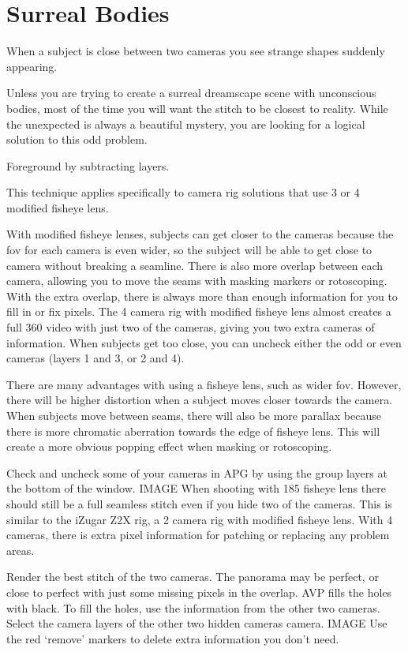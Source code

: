 \chapter{Surreal Bodies}
\pagecolor{white}
\label{chap:39}
\begin{fullwidth}


\problem

{\large When a subject is close between two cameras you see strange shapes suddenly appearing. \par}

Unless you are trying to create a surreal dreamscape scene with unconscious bodies, most of the time you will want the stitch to be closest to reality. While the unexpected is always a beautiful mystery, you are looking for a logical solution to this odd problem.  

\solutions

{\large Foreground by subtracting layers. \par}

This technique applies specifically to camera rig solutions that use 3 or 4 modified fisheye lens.

With modified fisheye lenses, subjects can get closer to the cameras because the fov for each camera is even wider, so the subject will be able to get close to camera without breaking a seamline. There is also more overlap between each camera, allowing you to move the seams with masking markers or rotoscoping. With the extra overlap, there is always more than enough information for you to fill in or fix pixels. The 4 camera rig with modified fisheye lens almost creates a full 360 video with just two of the cameras, giving you two extra cameras of information. When subjects get too close, you can uncheck either the odd or even cameras (layers 1 and 3, or 2 and 4). 

There are many advantages with using a fisheye lens, such as wider fov. However, there will be higher distortion when a subject moves closer towards the camera. When subjects move between seams, there will also be more parallax because there is more chromatic aberration towards the edge of fisheye lens. This will create a more obvious popping effect when masking or rotoscoping.

Check and uncheck some of your cameras in APG by using the group layers at the bottom of the window. IMAGE When shooting with 185 fisheye lens there should still be a full seamless stitch even if you hide two of the cameras.  This is similar to the iZugar Z2X rig, a 2 camera rig with modified fisheye lens. With 4 cameras, there is extra pixel information for patching or replacing any problem areas. 

Render the best stitch of the two cameras. The panorama may be perfect, or close to perfect with just some missing pixels in the overlap. AVP fills the holes with black. 
To fill the holes, use the information from the other two cameras. Select the camera layers of the other two hidden cameras camera. IMAGE Use the red ‘remove’ markers to delete extra information you don’t need.


\clearpage
\end{fullwidth}
